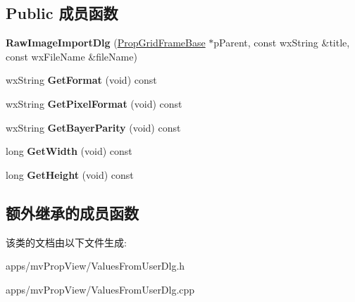 \subsection*{Public 成员函数}
\begin{DoxyCompactItemize}
\item 
\hypertarget{class_raw_image_import_dlg_aec1d77bc459b716882b64b74eeaea9cb}{{\bfseries Raw\+Image\+Import\+Dlg} (\hyperlink{class_prop_grid_frame_base}{Prop\+Grid\+Frame\+Base} $\ast$p\+Parent, const wx\+String \&title, const wx\+File\+Name \&file\+Name)}\label{class_raw_image_import_dlg_aec1d77bc459b716882b64b74eeaea9cb}

\item 
\hypertarget{class_raw_image_import_dlg_affd36d75afd2f14306ee0d22685b1ee8}{wx\+String {\bfseries Get\+Format} (void) const }\label{class_raw_image_import_dlg_affd36d75afd2f14306ee0d22685b1ee8}

\item 
\hypertarget{class_raw_image_import_dlg_afe047d135036880741b88135ac248afa}{wx\+String {\bfseries Get\+Pixel\+Format} (void) const }\label{class_raw_image_import_dlg_afe047d135036880741b88135ac248afa}

\item 
\hypertarget{class_raw_image_import_dlg_ae2e8a90db55ea14ab355816b94d1ee2f}{wx\+String {\bfseries Get\+Bayer\+Parity} (void) const }\label{class_raw_image_import_dlg_ae2e8a90db55ea14ab355816b94d1ee2f}

\item 
\hypertarget{class_raw_image_import_dlg_a6302d6e2671df990aaea3a3f0981d78b}{long {\bfseries Get\+Width} (void) const }\label{class_raw_image_import_dlg_a6302d6e2671df990aaea3a3f0981d78b}

\item 
\hypertarget{class_raw_image_import_dlg_a6a9fe116d07cf7e48daa306efe593ea5}{long {\bfseries Get\+Height} (void) const }\label{class_raw_image_import_dlg_a6a9fe116d07cf7e48daa306efe593ea5}

\end{DoxyCompactItemize}
\subsection*{额外继承的成员函数}


该类的文档由以下文件生成\+:\begin{DoxyCompactItemize}
\item 
apps/mv\+Prop\+View/Values\+From\+User\+Dlg.\+h\item 
apps/mv\+Prop\+View/Values\+From\+User\+Dlg.\+cpp\end{DoxyCompactItemize}
